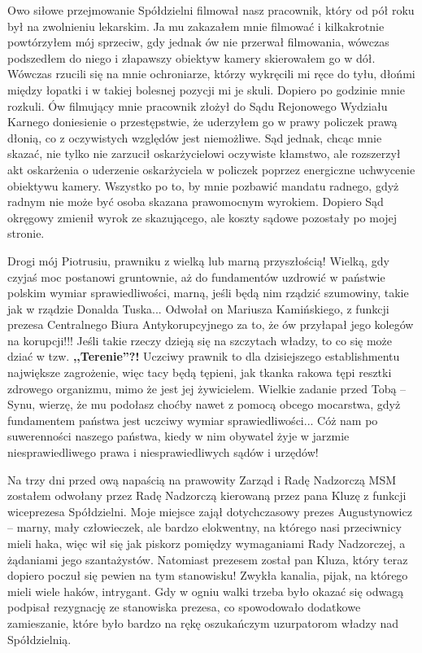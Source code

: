 Owo siłowe przejmowanie Spółdzielni filmował nasz pracownik, który od pół roku był na zwolnieniu lekarskim. Ja mu zakazałem mnie filmować i kilkakrotnie powtórzyłem mój sprzeciw, gdy jednak ów nie przerwał filmowania, wówczas podszedłem do niego i złapawszy obiektyw kamery skierowałem go w dół. Wówczas rzucili się na mnie ochroniarze, którzy wykręcili mi ręce do tyłu, dłońmi między łopatki i w takiej bolesnej pozycji mi je skuli. Dopiero po godzinie mnie rozkuli. Ów filmujący mnie pracownik złożył do Sądu Rejonowego Wydziału Karnego doniesienie o przestępstwie, że uderzyłem go w prawy policzek prawą dłonią, co z oczywistych względów jest niemożliwe. Sąd jednak, chcąc mnie skazać, nie tylko nie zarzucił oskarżycielowi oczywiste kłamstwo, ale rozszerzył akt oskarżenia o uderzenie oskarżyciela w policzek poprzez energiczne uchwycenie obiektywu kamery. Wszystko po to, by mnie pozbawić mandatu radnego, gdyż radnym nie może być osoba skazana prawomocnym wyrokiem. Dopiero Sąd okręgowy zmienił wyrok ze skazującego, ale koszty sądowe pozostały po mojej stronie.

Drogi mój Piotrusiu, prawniku z wielką lub marną przyszłością! Wielką, gdy czyjaś moc postanowi gruntownie, aż do fundamentów uzdrowić w państwie polskim wymiar sprawiedliwości, marną, jeśli będą nim rządzić szumowiny, takie jak w rządzie Donalda Tuska... Odwołał on Mariusza Kamińskiego, z funkcji prezesa Centralnego Biura Antykorupcyjnego za to, że ów przyłapał jego kolegów na korupcji!!! Jeśli takie rzeczy dzieją się na szczytach władzy, to co się może dziać w tzw. \textbf{,,Terenie''?!} Uczciwy prawnik to dla dzisiejszego establishmentu największe zagrożenie, więc tacy będą tępieni, jak tkanka rakowa tępi resztki zdrowego organizmu, mimo że jest jej żywicielem. Wielkie zadanie przed Tobą – Synu, wierzę, że mu podołasz choćby nawet z pomocą obcego mocarstwa, gdyż fundamentem państwa jest uczciwy wymiar sprawiedliwości... Cóż nam po suwerenności naszego państwa, kiedy w nim obywatel żyje w jarzmie niesprawiedliwego prawa i niesprawiedliwych sądów i urzędów!

Na trzy dni przed ową napaścią na prawowity Zarząd i Radę Nadzorczą MSM zostałem odwołany przez Radę Nadzorczą kierowaną przez pana Kluzę z funkcji wiceprezesa Spółdzielni. Moje miejsce zajął dotychczasowy prezes Augustynowicz – marny, mały człowieczek, ale bardzo elokwentny, na którego nasi przeciwnicy mieli haka, więc wił się jak piskorz pomiędzy wymaganiami Rady Nadzorczej, a żądaniami jego szantażystów. Natomiast prezesem został pan Kluza, który teraz dopiero poczuł się pewien na tym stanowisku! Zwykła kanalia, pijak, na którego mieli wiele haków, intrygant. Gdy w ogniu walki trzeba było okazać się odwagą podpisał rezygnację ze stanowiska prezesa, co spowodowało dodatkowe zamieszanie, które było bardzo na rękę oszukańczym uzurpatorom władzy nad Spółdzielnią.

